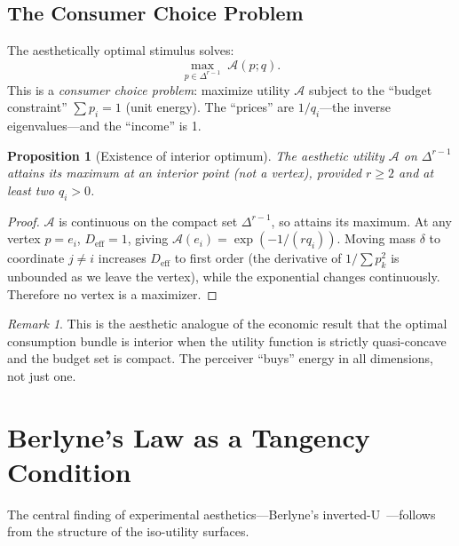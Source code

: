 \documentclass[journal]{IEEEtran}
\newtheorem{proposition}[theorem]{Proposition}
\theoremstyle{definition}
\theoremstyle{remark}
\newtheorem{remark}[theorem]{Remark}
\begin{document}
\subsection{The Consumer Choice Problem}

The aesthetically optimal stimulus solves:
\begin{equation}
    \max_{p \in \Delta^{r-1}} \; \mathcal{A}(p; q).
    \label{eq:choice}
\end{equation}
This is a \emph{consumer choice problem}: maximize utility
$\mathcal{A}$ subject to the ``budget constraint'' $\sum p_i = 1$
(unit energy).  The ``prices'' are $1/q_i$---the inverse
eigenvalues---and the ``income'' is 1.

\begin{proposition}[Existence of interior optimum]
\label{prop:existence}
The aesthetic utility $\mathcal{A}$ on $\Delta^{r-1}$ attains its
maximum at an interior point (not a vertex), provided $r \geq 2$
and at least two $q_i > 0$.
\end{proposition}

\begin{proof}
$\mathcal{A}$ is continuous on the compact set $\Delta^{r-1}$,
so attains its maximum.  At any vertex $p = e_i$,
$D_{\mathrm{eff}} = 1$, giving $\mathcal{A}(e_i) =
\exp(-1/(r q_i))$.  Moving mass $\delta$ to coordinate $j \neq i$
increases $D_{\mathrm{eff}}$ to first order (the derivative of
$1/\sum p_k^2$ is unbounded as we leave the vertex), while the
exponential changes continuously.  Therefore no vertex is a
maximizer.
\end{proof}

\begin{remark}
This is the aesthetic analogue of the economic result that the
optimal consumption bundle is interior when the utility function
is strictly quasi-concave and the budget set is compact.  The
perceiver ``buys'' energy in all dimensions, not just one.
\end{remark}


\section{Berlyne's Law as a Tangency Condition}
\label{sec:berlyne}

The central finding of experimental aesthetics---Berlyne's
inverted-U~\cite{berlyne1971aesthetics}---follows from the
structure of the iso-utility surfaces.
\end{document}
